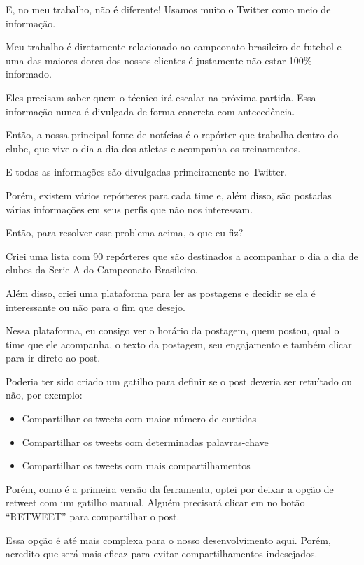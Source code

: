 \documentclass[
]{book}
\begin{document}
E, no meu trabalho, não é diferente! Usamos muito o Twitter como meio de
informação.

Meu trabalho é diretamente relacionado ao campeonato brasileiro de
futebol e uma das maiores dores dos nossos clientes é justamente não
estar 100\% informado.

Eles precisam saber quem o técnico irá escalar na próxima partida. Essa
informação nunca é divulgada de forma concreta com antecedência.

Então, a nossa principal fonte de notícias é o repórter que trabalha
dentro do clube, que vive o dia a dia dos atletas e acompanha os
treinamentos.

E todas as informações são divulgadas primeiramente no Twitter.

Porém, existem vários repórteres para cada time e, além disso, são
postadas várias informações em seus perfis que não nos interessam.

Então, para resolver esse problema acima, o que eu fiz?

Criei uma lista com 90 repórteres que são destinados a acompanhar o dia
a dia de clubes da Serie A do Campeonato Brasileiro.

Além disso, criei uma plataforma para ler as postagens e decidir se ela
é interessante ou não para o fim que desejo.

Nessa plataforma, eu consigo ver o horário da postagem, quem postou,
qual o time que ele acompanha, o texto da postagem, seu engajamento e
também clicar para ir direto ao post.

Poderia ter sido criado um gatilho para definir se o post deveria ser
retuítado ou não, por exemplo:

\begin{itemize}
\item
  Compartilhar os tweets com maior número de curtidas
\item
  Compartilhar os tweets com determinadas palavras-chave
\item
  Compartilhar os tweets com mais compartilhamentos
\end{itemize}

Porém, como é a primeira versão da ferramenta, optei por deixar a opção
de retweet com um gatilho manual. Alguém precisará clicar em no botão
``RETWEET'' para compartilhar o post.

Essa opção é até mais complexa para o nosso desenvolvimento aqui. Porém,
acredito que será mais eficaz para evitar compartilhamentos indesejados.
\end{document}
